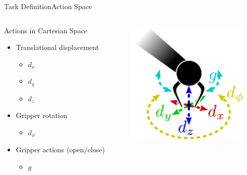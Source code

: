 \begin{frame}{Task Definition}{Action Space}
    \begin{columns}%
        \begin{column}{0.4\textwidth}%
            \begin{block}{Actions in Cartesian Space}
                \begin{itemize}
                    \item Translational displacement
                          \begin{itemize}
                              \item \(d_{x}\)
                              \item \(d_{y}\)
                              \item \(d_{z}\)
                          \end{itemize}
                    \item Gripper rotation
                          \begin{itemize}
                              \item \(d_{\phi}\)
                          \end{itemize}
                    \item Gripper actions (open/close)
                          \begin{itemize}
                              \item \(g\)
                          \end{itemize}
                \end{itemize}
            \end{block}
        \end{column}
        \begin{column}{0.6\textwidth}%
            \centering
            \includegraphics[height=6cm]{graphics/action_space.pdf}
        \end{column}
    \end{columns}
\end{frame}

